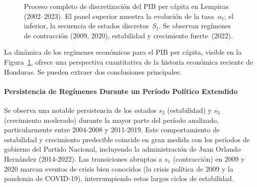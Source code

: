 \begin{figure}[H]
\caption{Proceso completo de discretización del PIB per cápita en Lempiras (2002--2023). El panel superior muestra la evolución de la tasa~$\alpha_t$; el inferior, la secuencia de estados discretos~$S_t$. Se observan regímenes de contracción (2009, 2020), estabilidad y crecimiento fuerte~(2022).}
\label{fig:discretizacion_completa_real}  %
\end{figure}

La dinámica de los regímenes económicos para el PIB per cápita, visible en la Figura~\ref{fig:discretizacion_completa_real}, ofrece una perspectiva cuantitativa de la historia económica reciente de Honduras. Se pueden extraer dos conclusiones principales:

\paragraph{Persistencia de Regímenes Durante un Período Político Extendido}
Se observa una notable persistencia de los estados \(s_2\) (estabilidad) y \(s_3\) (crecimiento moderado) durante la mayor parte del período analizado, particularmente entre 2004-2008 y 2011-2019. Este comportamiento de estabilidad y crecimiento predecible coincide en gran medida con los períodos de gobierno del Partido Nacional, incluyendo la administración de Juan Orlando Hernández (2014-2022). Las transiciones abruptas a \(s_1\) (contracción) en 2009 y 2020 marcan eventos de crisis bien conocidos (la crisis política de 2009 y la pandemia de COVID-19), interrumpiendo estos largos ciclos de estabilidad.

